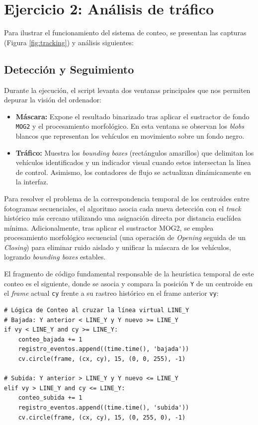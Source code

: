 \documentclass[12pt,a4paper]{article}
\begin{document}
\section{Ejercicio 2: Análisis de tráfico}
Para ilustrar el funcionamiento del sistema de conteo, se presentan las capturas (Figura \ref{fig:tracking}) y análisis siguientes:

\subsection{Detección y Seguimiento}

Durante la ejecución, el script levanta dos ventanas principales que nos permiten depurar la visión del ordenador: 

\begin{itemize}
    \item \textbf{Máscara:} Expone el resultado binarizado tras aplicar el sustractor de fondo \texttt{MOG2} y el procesamiento morfológico. En esta ventana se observan los \textit{blobs} blancos que representan los vehículos en movimiento sobre un fondo negro.
    \item \textbf{Tráfico:} Muestra los \textit{bounding boxes} (rectángulos amarillos) que delimitan los vehículos identificados y un indicador visual cuando estos intersectan la línea de control. Asimismo, los contadores de flujo se actualizan dinámicamente en la interfaz.
\end{itemize}

Para resolver el problema de la correspondencia temporal de los centroides entre fotogramas secuenciales, el algoritmo asocia cada nueva detección con el \textit{track} histórico más cercano utilizando una asignación directa por distancia euclídea mínima. Adicionalmente, tras aplicar el sustractor MOG2, se emplea procesamiento morfológico secuencial (una operación de \textit{Opening} seguida de un \textit{Closing}) para eliminar ruido aislado y unificar la máscara de los vehículos, logrando \textit{bounding boxes} estables. 

El fragmento de código fundamental responsable de la heurística temporal de este conteo es el siguiente, donde se asocia y compara la posición \texttt{Y} de un centroide en el \textit{frame} actual \texttt{cy} frente a su rastreo histórico en el frame anterior \texttt{vy}:

\begin{verbatim}
# Lógica de Conteo al cruzar la línea virtual LINE_Y
# Bajada: Y anterior < LINE_Y y Y nuevo >= LINE_Y
if vy < LINE_Y and cy >= LINE_Y:
    conteo_bajada += 1
    registro_eventos.append((time.time(), 'bajada'))
    cv.circle(frame, (cx, cy), 15, (0, 0, 255), -1) 

# Subida: Y anterior > LINE_Y y Y nuevo <= LINE_Y
elif vy > LINE_Y and cy <= LINE_Y:
    conteo_subida += 1
    registro_eventos.append((time.time(), 'subida'))
    cv.circle(frame, (cx, cy), 15, (0, 255, 0), -1)
\end{verbatim}
\end{document}

